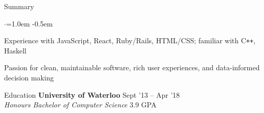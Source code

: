 \documentclass{resume} %
\begin{document}

\begin{rSection}{Summary}
  \vspace {0.5em}
  \begin{list}{$\cdot$}{\leftmargin=1.0em}
    \itemsep -0.5em \vspace{-0.5em}
    \item Experience with JavaScript, React, Ruby/Rails, HTML/CSS; familiar with C\texttt{++}, Haskell
    \item Passion for clean, maintainable software, rich user experiences, and data-informed decision making
  \end{list}
  \vspace{0.5em}
\end{rSection}


\begin{rSection}{Education}
  {\bf University of Waterloo} \hfill {Sept '13 -- Apr '18} \\
  {\em Honours Bachelor of Computer Science} \hfill {3.9 GPA}
\end{rSection}

\vspace{0.5em}

\end{document}
